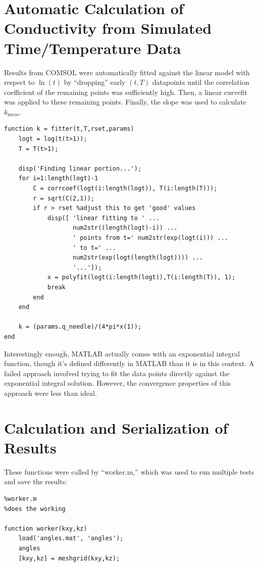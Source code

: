 \section{Automatic Calculation of Conductivity from Simulated Time/Temperature Data}

Results from COMSOL were automatically fitted against the linear model with
respect to \(\ln(t)\) by ``dropping'' early \((t,T)\) datapoints until the
correlation coefficient of the remaining points was sufficiently high. Then, a
linear curvefit was applied to these remaining points. Finally, the slope was
used to calculate \(k_{\textrm{meas}}\).

\small
\begin{verbatim}
function k = fitter(t,T,rset,params)
    logt = log(t(t>1));
    T = T(t>1);

    disp('Finding linear portion...');    
    for i=1:length(logt)-1
        C = corrcoef(logt(i:length(logt)), T(i:length(T)));
        r = sqrt(C(2,1));
        if r > rset %adjust this to get 'good' values
            disp([ 'linear fitting to ' ...
                   num2str((length(logt)-i)) ...
                   ' points from t=' num2str(exp(logt(i))) ...
                   ' to t=' ...
                   num2str(exp(logt(length(logt)))) ...
                   '...']);
            x = polyfit(logt(i:length(logt)),T(i:length(T)), 1);
            break
        end
    end

    k = (params.q_needle)/(4*pi*x(1));
end
\end{verbatim}
\normalsize

Interestingly enough, MATLAB actually comes with an exponential integral
function, though it's defined differently in MATLAB than it is in this context.
A failed approach involved trying to fit the data points directly against the
exponential integral solution. However, the convergence properties of this
approach were less than ideal.

\section{Calculation and Serialization of Results}

These functions were called by ``worker.m,'' which was used to run multiple
tests and save the results:

\small
\begin{verbatim}
%worker.m
%does the working

function worker(kxy,kz)
    load('angles.mat', 'angles');
    angles
    [kxy,kz] = meshgrid(kxy,kz);

\end{verbatim}
\normalsize


